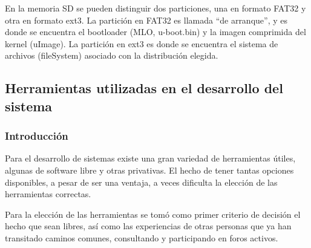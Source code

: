 \documentclass[%
        final,
        notitlepage,
        narroweqnarray,
        inline,
        ]{ieee}
\begin{document}
En la memoria SD se pueden distinguir dos particiones, una en formato FAT32 y otra
en formato ext3. La partición en FAT32 es llamada “de arranque”, y es donde se encuentra 
el bootloader (MLO, u-boot.bin) y la imagen comprimida del kernel (uImage). 
La partición en ext3 es donde se encuentra el sistema de archivos (fileSystem) asociado con la distribución elegida.

%
%
%


\subsection{Herramientas utilizadas en el desarrollo del sistema}

\subsubsection{Introducción}
Para el desarrollo de sistemas existe una gran variedad de herramientas útiles, algunas de software libre y otras privativas. El hecho de tener tantas opciones disponibles, a pesar de ser una ventaja, a veces dificulta la elección de las herramientas correctas.

Para la elección de las herramientas se tomó como primer criterio de decisión el hecho que sean libres, así como las experiencias de otras personas que ya han transitado caminos comunes, consultando y participando en foros activos.
\end{document}
